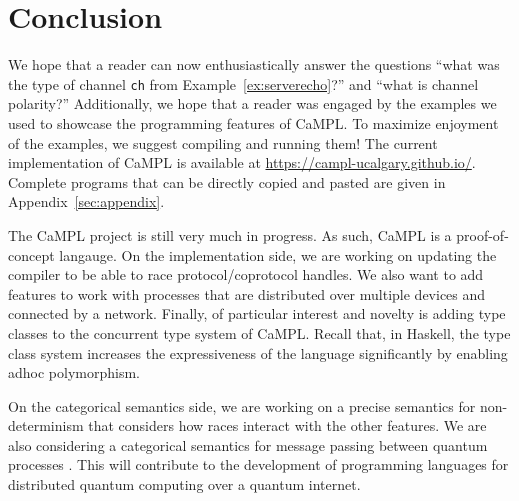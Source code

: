 \documentclass[acmsmall]{acmart}
\begin{document}



\section{Conclusion}

We hope that a reader can now enthusiastically answer the questions  ``what was the type of channel \lstinline$ch$ from Example~\ref{ex:serverecho}?'' and ``what is channel polarity?''
Additionally, we hope that a reader was engaged by the examples we used to showcase the programming features of CaMPL.
To maximize enjoyment of the examples, we suggest compiling and running them!
The current implementation of CaMPL is available at \url{https://campl-ucalgary.github.io/}.
Complete programs that can be directly copied and pasted are given in Appendix~\ref{sec:appendix}.

The CaMPL project is still very much in progress.
As such, CaMPL is a proof-of-concept langauge.
On the implementation side, we are working on updating the compiler to be able to race protocol/coprotocol handles.
We also want to add features to work with processes that are distributed over multiple devices and connected by a network. 
Finally, of particular interest and novelty is adding type classes to the concurrent type system of CaMPL. Recall that, in Haskell, the type class system increases the expressiveness of the language significantly by enabling adhoc polymorphism. 

On the categorical semantics side, we are working on a precise semantics for non-determinism that considers how races interact with the other features.
We are also considering a categorical semantics for message passing between quantum processes \cite{QMP23}.
This will contribute to the development of programming languages for distributed quantum computing over a quantum internet.
\end{document}
